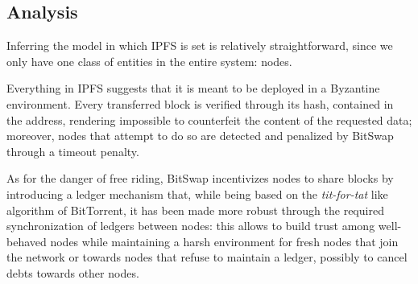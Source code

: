 \documentclass[mscthesis]{usiinfthesis}
\begin{document}
\subsection{Analysis}\label{sec:ipfsanalysis}
Inferring the model in which IPFS is set is relatively straightforward, since we only have one class of entities in the entire system: nodes.

Everything in IPFS suggests that it is meant to be deployed in a Byzantine environment. Every transferred block is verified through its hash, contained in the address, rendering impossible to counterfeit the content of the requested data; moreover, nodes that attempt to do so are detected and penalized by BitSwap through a timeout penalty.

As for the danger of free riding, BitSwap incentivizes nodes to share blocks by introducing a ledger mechanism that, while being based on the \textit{tit-for-tat} like algorithm of BitTorrent, it has been made more robust through the required synchronization of ledgers between nodes: this allows to build trust among well-behaved nodes while maintaining a harsh environment for fresh nodes that join the network or towards nodes that refuse to maintain a ledger, possibly to cancel debts towards other nodes. %
\end{document}
